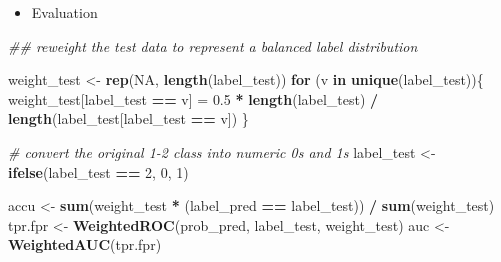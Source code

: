 \documentclass[
]{article}
\newenvironment{Shaded}{\begin{snugshade}}{\end{snugshade}}
\newcommand{\CommentTok}[1]{\textcolor[rgb]{0.56,0.35,0.01}{\textit{#1}}}
\newcommand{\ControlFlowTok}[1]{\textcolor[rgb]{0.13,0.29,0.53}{\textbf{#1}}}
\newcommand{\DataTypeTok}[1]{\textcolor[rgb]{0.13,0.29,0.53}{#1}}
\newcommand{\DecValTok}[1]{\textcolor[rgb]{0.00,0.00,0.81}{#1}}
\newcommand{\FloatTok}[1]{\textcolor[rgb]{0.00,0.00,0.81}{#1}}
\newcommand{\KeywordTok}[1]{\textcolor[rgb]{0.13,0.29,0.53}{\textbf{#1}}}
\newcommand{\NormalTok}[1]{#1}
\newcommand{\OperatorTok}[1]{\textcolor[rgb]{0.81,0.36,0.00}{\textbf{#1}}}
\newcommand{\OtherTok}[1]{\textcolor[rgb]{0.56,0.35,0.01}{#1}}
\newcommand{\StringTok}[1]{\textcolor[rgb]{0.31,0.60,0.02}{#1}}
\providecommand{\tightlist}{%
  \setlength{\itemsep}{0pt}\setlength{\parskip}{0pt}}
\begin{document}
\begin{Shaded}
\end{Shaded}

\begin{itemize}
\tightlist
\item
  Evaluation
\end{itemize}

\begin{Shaded}
\begin{Highlighting}[]
\CommentTok{## reweight the test data to represent a balanced label distribution}

\NormalTok{weight_test <-}\StringTok{ }\KeywordTok{rep}\NormalTok{(}\OtherTok{NA}\NormalTok{, }\KeywordTok{length}\NormalTok{(label_test))}
\ControlFlowTok{for}\NormalTok{ (v }\ControlFlowTok{in} \KeywordTok{unique}\NormalTok{(label_test))\{}
\NormalTok{  weight_test[label_test }\OperatorTok{==}\StringTok{ }\NormalTok{v] =}\StringTok{ }\FloatTok{0.5} \OperatorTok{*}\StringTok{ }\KeywordTok{length}\NormalTok{(label_test) }\OperatorTok{/}\StringTok{ }\KeywordTok{length}\NormalTok{(label_test[label_test }\OperatorTok{==}\StringTok{ }\NormalTok{v])}
\NormalTok{\}}


\CommentTok{# convert the original 1-2 class into numeric 0s and 1s}
\NormalTok{label_test <-}\StringTok{ }\KeywordTok{ifelse}\NormalTok{(label_test }\OperatorTok{==}\StringTok{ }\DecValTok{2}\NormalTok{, }\DecValTok{0}\NormalTok{, }\DecValTok{1}\NormalTok{)}

\NormalTok{accu <-}\StringTok{ }\KeywordTok{sum}\NormalTok{(weight_test }\OperatorTok{*}\StringTok{ }\NormalTok{(label_pred }\OperatorTok{==}\StringTok{ }\NormalTok{label_test)) }\OperatorTok{/}\StringTok{ }\KeywordTok{sum}\NormalTok{(weight_test)}
\NormalTok{tpr.fpr <-}\StringTok{ }\KeywordTok{WeightedROC}\NormalTok{(prob_pred, label_test, weight_test)}
\NormalTok{auc <-}\StringTok{ }\KeywordTok{WeightedAUC}\NormalTok{(tpr.fpr)}
\end{Highlighting}
\end{Shaded}
\end{document}
